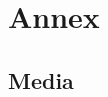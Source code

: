 \documentclass[a4paper,12pt,twoside]{article}
\begin{document}





\newpage
\section{Annex}
\subsection{Media}
\end{document}
